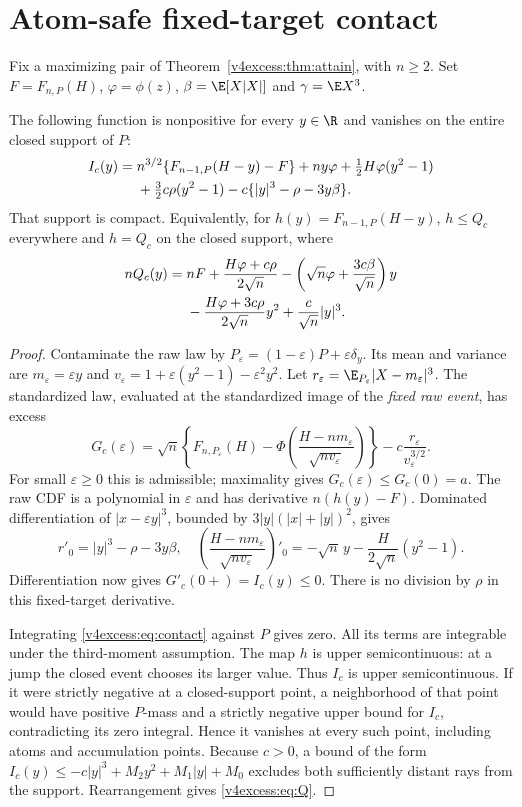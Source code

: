 \section{Atom-safe fixed-target contact}
Fix a maximizing pair of Theorem~\ref{v4excess:thm:attain}, with $n\ge2$. Set
$F=F_{n,P}(H)$, $\varphi=\phi(z)$,
$\beta=\E[X|X|]$ and $\gamma=\E X^3$.
\begin{theorem}\label{v4excess:thm:contact}
The following function is nonpositive for every $y\in\R$ and vanishes
on the entire closed support of $P$:
\begin{align}
 I_c(y)={}&n^{3/2}\{F_{n-1,P}(H-y)-F\}+ny\varphi
       +\tfrac12 H\varphi(y^2-1)\notag\\
 &+\tfrac32c\rho(y^2-1)-c\{|y|^3-\rho-3y\beta\}.
 \label{v4excess:eq:contact}
\end{align}
That support is compact. Equivalently, for $h(y)=F_{n-1,P}(H-y)$,
$h\le Q_c$ everywhere and $h=Q_c$ on the closed support, where
\begin{align}
 nQ_c(y)={}&nF+\frac{H\varphi+c\rho}{2\sqrt n}
  -\left(\sqrt n\varphi+\frac{3c\beta}{\sqrt n}\right)y\notag\\
 &-\frac{H\varphi+3c\rho}{2\sqrt n}y^2
  +\frac{c}{\sqrt n}|y|^3.\label{v4excess:eq:Q}
\end{align}
\end{theorem}
\begin{proof}
Contaminate the raw law by
$P_\varepsilon=(1-\varepsilon)P+\varepsilon\delta_y$. Its mean and variance
are $m_\varepsilon=\varepsilon y$ and
$v_\varepsilon=1+\varepsilon(y^2-1)-\varepsilon^2y^2$.
Let $r_\varepsilon=\E_{P_\varepsilon}|X-m_\varepsilon|^3$. The standardized
law, evaluated at the standardized image of the \emph{fixed raw event},
has excess
\[
 G_c(\varepsilon)=\sqrt n\left\{F_{n,P_\varepsilon}(H)
 -\Phi\!\left(\frac{H-nm_\varepsilon}{\sqrt{nv_\varepsilon}}\right)\right\}
 -c\frac{r_\varepsilon}{v_\varepsilon^{3/2}}.
\]
For small $\varepsilon\ge0$ this is admissible; maximality gives
$G_c(\varepsilon)\le G_c(0)=a$. The raw CDF is a polynomial in
$\varepsilon$ and has derivative $n(h(y)-F)$. Dominated differentiation
of $|x-\varepsilon y|^3$, bounded by
$3|y|(|x|+|y|)^2$, gives
\[
 r'_0=|y|^3-\rho-3y\beta,
 \quad \left(\frac{H-nm_\varepsilon}{\sqrt{nv_\varepsilon}}\right)'_0
 =-\sqrt n\,y-\frac{H}{2\sqrt n}(y^2-1).
\]
Differentiation now gives $G'_c(0+)=I_c(y)\le0$. There is no division by
$\rho$ in this fixed-target derivative.

Integrating \eqref{v4excess:eq:contact} against $P$ gives zero. All its terms are
integrable under the third-moment assumption. The map $h$ is upper
semicontinuous: at a jump the closed event chooses its larger value.
Thus $I_c$ is upper semicontinuous. If it were strictly negative at a
closed-support point, a neighborhood of that point would have positive
$P$-mass and a strictly negative upper bound for $I_c$, contradicting its
zero integral. Hence it vanishes at every such point, including atoms and
accumulation points. Because $c>0$, a bound of the form
$I_c(y)\le-c|y|^3+M_2y^2+M_1|y|+M_0$ excludes both sufficiently distant
rays from the support. Rearrangement gives \eqref{v4excess:eq:Q}.
\end{proof}

